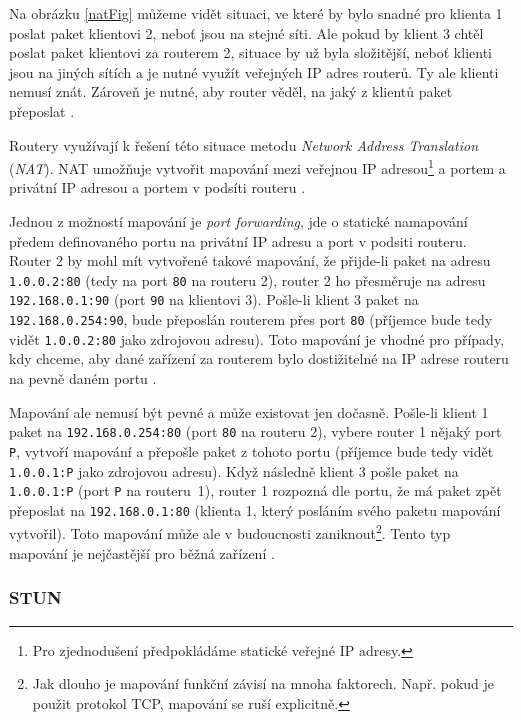 Na obrázku \ref{natFig} můžeme vidět situaci, ve které by bylo snadné pro
klienta 1 poslat paket klientovi 2, neboť jsou na stejné síti. Ale pokud by
klient 3 chtěl poslat paket klientovi za routerem 2, situace by už byla
složitější, neboť klienti jsou na jiných sítích a je nutné využít veřejných IP
adres routerů. Ty ale klienti nemusí znát. Zároveň je nutné, aby router
věděl, na jaký z klientů paket přeposlat \cite{WebRTCForTheCurious}.

Routery využívají k řešení této situace metodu \textit{Network Address
Translation} (\textit{NAT}). NAT umožňuje vytvořit mapování mezi veřejnou IP
adresou\footnote{Pro zjednodušení předpokládáme statické veřejné IP adresy.} a
portem a privátní IP adresou a portem v podsíti routeru
\cite{WebRTCForTheCurious}.

Jednou z možností mapování je \textit{port forwarding}, jde o statické
namapování předem definovaného portu na privátní IP adresu a port v podsiti
routeru. Router 2 by mohl mít vytvořené takové mapování, že přijde-li paket na
adresu \texttt{1.0.0.2:80} (tedy na port \texttt{80} na
routeru 2), router 2 ho přesměruje na adresu \texttt{192.168.0.1:90}
(port \texttt{90} na klientovi 3). Pošle-li klient 3 paket na
\texttt{192.168.0.254:90}, bude přeposlán routerem přes port
\texttt{80} (příjemce bude tedy vidět \texttt{1.0.0.2:80}
jako zdrojovou adresu). Toto mapování je vhodné pro případy, kdy chceme, aby
dané zařízení za routerem bylo dostižitelné na IP adrese routeru na pevně daném
portu \cite{G2-WhatIsPortForwarding}.

Mapování ale nemusí být pevné a může existovat jen dočasně. Pošle-li klient 1
paket na \texttt{192.168.0.254:80} (port \texttt{80} na
routeru 2), vybere router 1 nějaký port \texttt{P}, vytvoří mapování a
přepošle paket z tohoto portu (příjemce bude tedy vidět
\texttt{1.0.0.1:P} jako zdrojovou adresu). Když následně klient 3
pošle paket na \texttt{1.0.0.1:P} (port \texttt{P} na
routeru~1), router 1 rozpozná dle portu, že má paket zpět přeposlat na
\texttt{192.168.0.1:80} (klienta 1, který posláním svého paketu
mapování vytvořil). Toto mapování může ale v budoucnosti zaniknout\footnote{Jak
dlouho je mapování funkční závisí na mnoha faktorech. Např. pokud je použit
protokol TCP, mapování se ruší explicitně.}. Tento typ mapování je nejčastější
pro běžná zařízení \cite{WebRTCForTheCurious}.

\subsubsection{STUN}

